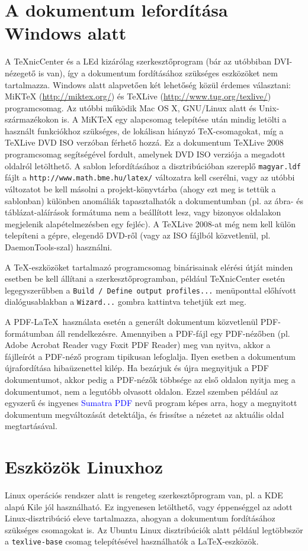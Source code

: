 \section{A dokumentum lefordítása Windows alatt}
A TeXnicCenter és a LEd kizárólag szerkesztőprogram (bár az utóbbiban DVI-nézegető is van), így a dokumentum fordításához szükséges eszközöket nem tartalmazza. Windows alatt alapvetően két lehetőség közül érdemes választani: MiKTeX (\url{http://miktex.org/}) és TeXLive (\url{http://www.tug.org/texlive/}) programcsomag. Az utóbbi működik Mac OS X, GNU/Linux alatt és Unix-származékokon is. A MiKTeX egy alapcsomag telepítése után mindig letölti a használt funkciókhoz szükséges, de lokálisan hiányzó \TeX-csomagokat, míg a TeXLive DVD ISO verzóban férhető hozzá. Ez a dokumentum TeXLive 2008 programcsomag segítségével fordult, amelynek DVD ISO verziója a megadott oldalról letölthető. A sablon lefordításához a disztribúcióban szereplő \verb+magyar.ldf+ fájlt a \verb+http://www.math.bme.hu/latex/+ változatra kell cserélni, vagy az utóbbi változatot be kell másolni a projekt-könyvtárba (ahogy ezt meg is tettük a sablonban) különben anomáliák tapasztalhatók a dokumentumban (pl. az ábra- és táblázat-aláírások formátuma nem a beállított lesz, vagy bizonyos oldalakon megjelenik alapételmezésben egy fejléc). A TeXLive 2008-at még nem kell külön telepíteni a gépre, elegendő DVD-ről (vagy az ISO fájlból közvetlenül, pl. DaemonTools-szal) használni. 

A \TeX-eszközöket tartalmazó programcsomag binárisainak elérési útját minden esetben be kell állítani a szerkesztőprogramban, például TeXnicCenter esetén legegyszerűbben a \verb+Build / Define output profiles...+ menüponttal előhívott dialógusablakban a \verb+Wizard...+ gombra kattintva tehetjük ezt meg.

A PDF-\LaTeX~használata esetén a generált dokumentum közvetlenül PDF-formátumban áll rendelkezésre. Amennyiben a PDF-fájl egy PDF-nézőben (pl. Adobe Acrobat Reader vagy Foxit PDF Reader) meg van nyitva, akkor a fájlleírót a PDF-néző program tipikusan lefoglalja. Ilyen esetben a dokumentum újrafordítása hibaüzenettel kilép. Ha bezárjuk és újra megnyitjuk a PDF dokumentumot, akkor pedig a PDF-nézők többsége az első oldalon nyitja meg a dokumentumot, nem a legutóbb olvasott oldalon. Ezzel szemben például az egyszerű és ingyenes \textcolor{blue}{Sumatra PDF} nevű program képes arra, hogy a megnyitott dokumentum megváltozását detektálja, és frissítse a nézetet az aktuális oldal megtartásával.

\section{Eszközök Linuxhoz}
Linux operációs rendszer alatt is rengeteg szerkesztőprogram van, pl. a KDE alapú Kile jól használható. Ez ingyenesen letölthető, vagy éppenséggel az adott Linux-disztribúció eleve tartalmazza, ahogyan a dokumentum fordításához szükséges csomagokat is. Az Ubuntu Linux disztribúciók alatt például legtöbbször a \verb+texlive-base+ csomag telepítésével használhatók a \LaTeX-eszközök.
